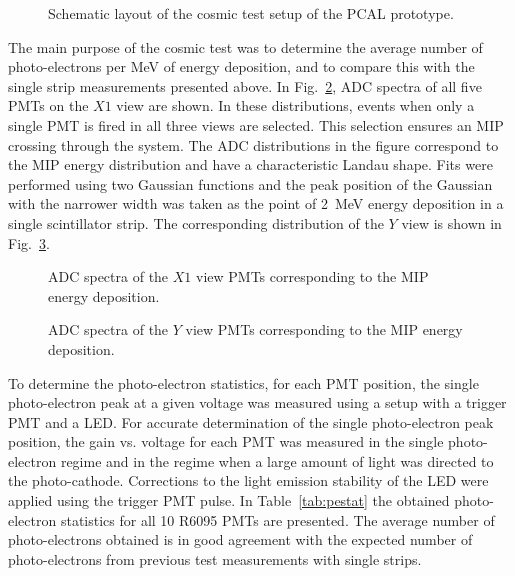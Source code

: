 \begin{figure}[htb]
\vspace{13.cm} 
\caption{\small{Schematic layout of the cosmic test setup of the PCAL 
prototype.}}
\label{fig:cosmset}
\end{figure}

The main purpose of the cosmic test was to determine the average number of
photo-electrons per MeV of energy deposition, and to compare this with the
single strip measurements presented above. In Fig.~\ref{fig:XADC}, ADC 
spectra of all five PMTs on the $X1$ view are shown.  In these
distributions, events when only a single PMT is fired in all three views 
are selected.  This selection ensures an MIP crossing through the system. 
The ADC distributions in the figure correspond to the MIP energy
distribution and have a characteristic Landau shape.  Fits were performed
using two Gaussian functions and the peak position of the Gaussian with
the narrower width was taken as the point of 2~MeV energy deposition in a
single scintillator strip.  The corresponding distribution of the $Y$ view 
is shown in Fig.~\ref{fig:YADC}.  

\begin{figure}[htb]
\vspace{14.cm} 
\caption{\small{ADC spectra of the $X1$ view PMTs corresponding to the MIP 
energy deposition.}}
\label{fig:XADC}
\end{figure}


\begin{figure}[htb]
\vspace{14.cm} 
\caption{\small{ADC spectra of the $Y$ view PMTs corresponding to the MIP 
energy deposition.}}
\label{fig:YADC}
\end{figure}

To determine the photo-electron statistics, for each PMT position, the
single photo-electron peak at a given voltage was measured using a
setup with a trigger PMT and a LED.  For accurate determination of the
single photo-electron peak position, the gain vs. voltage for each PMT was
measured in the single photo-electron regime and in the regime when a large
amount of light was directed to the photo-cathode.  Corrections to the
light emission stability of the LED were applied using the trigger PMT
pulse.  In Table~\ref{tab:pestat} the obtained photo-electron statistics for
all 10 R6095 PMTs are presented.  The average number of photo-electrons 
obtained is in good agreement with the expected number of photo-electrons 
from previous test measurements with single strips.

